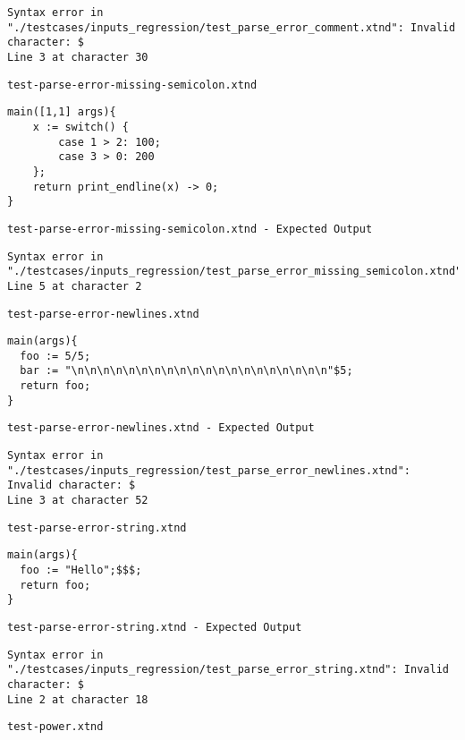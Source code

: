 \begin{lstlisting}
Syntax error in "./testcases/inputs_regression/test_parse_error_comment.xtnd": Invalid character: $
Line 3 at character 30
\end{lstlisting}


\medskip \noindent \texttt{test-parse-error-missing-semicolon.xtnd}


\begin{lstlisting}
main([1,1] args){
	x := switch() {
		case 1 > 2: 100;
		case 3 > 0: 200
	};
	return print_endline(x) -> 0;
}
\end{lstlisting}


\medskip \noindent \texttt{test-parse-error-missing-semicolon.xtnd - Expected Output}


\begin{lstlisting}
Syntax error in "./testcases/inputs_regression/test_parse_error_missing_semicolon.xtnd": 
Line 5 at character 2
\end{lstlisting}


\medskip \noindent \texttt{test-parse-error-newlines.xtnd}


\begin{lstlisting}
main(args){
  foo := 5/5;
  bar := "\n\n\n\n\n\n\n\n\n\n\n\n\n\n\n\n\n\n\n\n"$5;
  return foo;
}
\end{lstlisting}


\medskip \noindent \texttt{test-parse-error-newlines.xtnd - Expected Output}


\begin{lstlisting}
Syntax error in "./testcases/inputs_regression/test_parse_error_newlines.xtnd": Invalid character: $
Line 3 at character 52
\end{lstlisting}


\medskip \noindent \texttt{test-parse-error-string.xtnd}


\begin{lstlisting}
main(args){
  foo := "Hello";$$$;
  return foo;
}
\end{lstlisting}


\medskip \noindent \texttt{test-parse-error-string.xtnd - Expected Output}


\begin{lstlisting}
Syntax error in "./testcases/inputs_regression/test_parse_error_string.xtnd": Invalid character: $
Line 2 at character 18
\end{lstlisting}


\medskip \noindent \texttt{test-power.xtnd}


